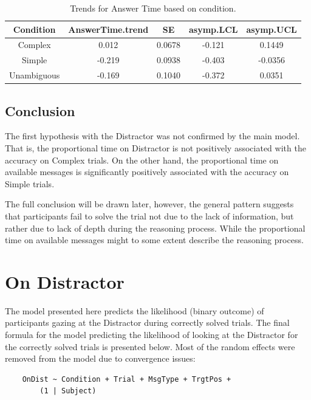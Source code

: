 \begin{table}[h!]
\centering
\begin{tabular}{|c|c|c|c|c|}
\hline
\textbf{Condition} & \textbf{AnswerTime.trend} & \textbf{SE} & \textbf{asymp.LCL} & \textbf{asymp.UCL} \\ \hline
Complex            & 0.012                     & 0.0678      & -0.121             & 0.1449             \\ \hline
Simple             & -0.219                    & 0.0938      & -0.403             & -0.0356            \\ \hline
Unambiguous        & -0.169                    & 0.1040      & -0.372             & 0.0351             \\ \hline
\end{tabular}
\caption{Trends for Answer Time based on condition.}
\label{tab:answertime_trends}
\end{table}

\subsection*{Conclusion}
The first hypothesis with the Distractor was not confirmed by the main model. That is, the proportional time on Distractor is not positively associated with the accuracy on Complex trials. On the other hand, the proportional time on available messages is significantly positively associated with the accuracy on Simple trials. 

The full conclusion will be drawn later, however, the general pattern suggests that participants fail to solve the trial not due to the lack of information, but rather due to lack of depth during the reasoning process. While the proportional time on available messages might to some extent describe the reasoning process.















\section{On Distractor}
\label{sec:distractor_model}

The model presented here predicts the likelihood (binary outcome) of participants gazing at the Distractor during correctly solved trials. The final formula for the model predicting the likelihood of looking at the Distractor for the correctly solved trials is presented below. Most of the random effects were removed from the model due to convergence issues:
\begin{verbatim}
    OnDist ~ Condition + Trial + MsgType + TrgtPos +
        (1 | Subject)
\end{verbatim}

